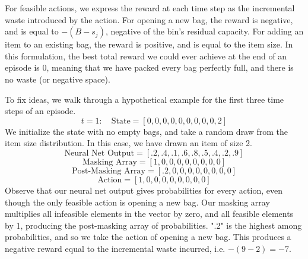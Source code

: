 \begin{appendices}
For feasible actions, we express the reward at each time step as the incremental waste introduced by the action.  For opening a new bag, the reward is negative, and is equal to $-(B - s_j)$, negative of the bin's residual capacity. 
For adding an item to an existing bag, the reward is positive, and is equal to the item size.  %
In this formulation, the best total reward we could ever achieve at the end of an episode is 0, meaning that we have packed every bag perfectly full, and there is no waste (or negative space).

To fix ideas, we walk through a hypothetical example for the first three time steps of an episode.
\[t = 1: \quad \text{State} = [0, 0, 0, 0, 0, 0, 0, 0, 0, 2]\]
We initialize the state with no empty bags, and take a random draw from the item size distribution.  In this case, we have drawn an item of size 2.
\[\text{Neural Net Output} = [.2, .4, .1, .6, .8, .5, .4, .2, .9]\]
\[\text{Masking Array} = [1, 0, 0, 0, 0, 0, 0, 0, 0]\]
\[\text{Post-Masking Array} = [.2, 0, 0, 0, 0, 0, 0, 0, 0]\]
\[\text{Action} = [1, 0, 0, 0, 0, 0, 0, 0, 0]\]
Observe that our neural net output gives probabilities for every action, even though the only feasible action is opening a new bag.  Our masking array multiplies all infeasible elements in the vector by zero, and all feasible elements by 1, producing the post-masking array of probabilities.  ".2" is the highest among probabilities, and so we take the action of opening a new bag.  This produces a negative reward equal to the incremental waste incurred, i.e. $-(9-2) = -7$.


\end{appendices}
